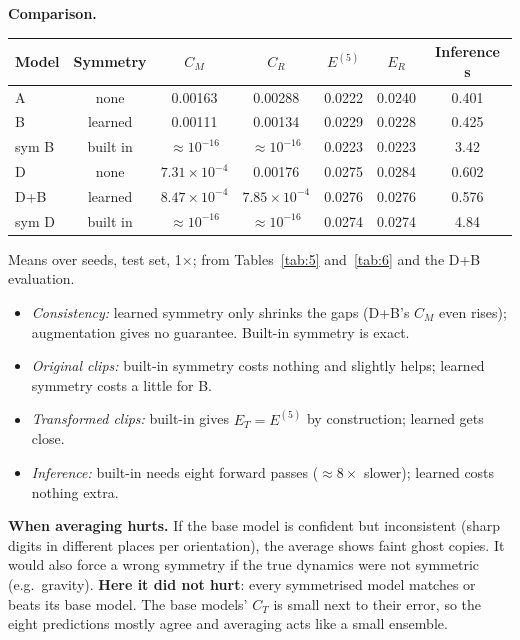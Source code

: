 \documentclass[11pt, a4paper]{article}
\begin{document}
\textbf{Comparison.}

\begin{center}
\begin{tabular}{lcccccc}
\toprule
Model & Symmetry & $C_M$ & $C_R$ & $E^{(5)}$ & $E_R$ & Inference s \\
\midrule
A & none & 0.00163 & 0.00288 & 0.0222 & 0.0240 & 0.401 \\
B & learned & 0.00111 & 0.00134 & 0.0229 & 0.0228 & 0.425 \\
sym B & built in & $\approx 10^{-16}$ & $\approx 10^{-16}$ & 0.0223 & 0.0223 & 3.42 \\
\midrule
D & none & $7.31\times10^{-4}$ & 0.00176 & 0.0275 & 0.0284 & 0.602 \\
D+B & learned & $8.47\times10^{-4}$ & $7.85\times10^{-4}$ & 0.0276 & 0.0276 & 0.576 \\
sym D & built in & $\approx 10^{-16}$ & $\approx 10^{-16}$ & 0.0274 & 0.0274 & 4.84 \\
\bottomrule
\end{tabular}

\smallskip
{\small Means over seeds, test set, 1$\times$; from Tables~\ref{tab:5} and~\ref{tab:6} and the D+B evaluation.}
\end{center}

\begin{itemize}[itemsep=0pt]
  \item \emph{Consistency:} learned symmetry only shrinks the gaps (D+B's $C_M$ even rises); augmentation gives no guarantee. Built-in symmetry is exact.
  \item \emph{Original clips:} built-in symmetry costs nothing and slightly helps; learned symmetry costs a little for B.
  \item \emph{Transformed clips:} built-in gives $E_T = E^{(5)}$ by construction; learned gets close.
  \item \emph{Inference:} built-in needs eight forward passes ($\approx8\times$ slower); learned costs nothing extra.
\end{itemize}

\textbf{When averaging hurts.} If the base model is confident but inconsistent (sharp digits in different places per orientation), the average shows faint ghost copies. It would also force a wrong symmetry if the true dynamics were not symmetric (e.g.\ gravity). \textbf{Here it did not hurt}: every symmetrised model matches or beats its base model. The base models' $C_T$ is small next to their error, so the eight predictions mostly agree and averaging acts like a small ensemble.
\end{document}
